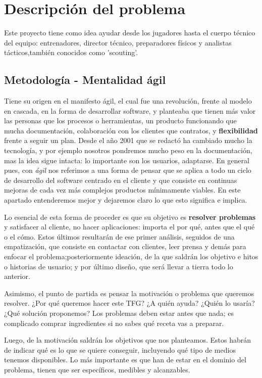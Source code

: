 \chapter{Descripción del problema}

Este proyecto tiene como idea ayudar desde los jugadores hasta 
el cuerpo técnico del equipo: entrenadores, director técnico, preparadores 
físicos y analistas tácticos,también conocidos como 'scouting'.

\section{Metodología - Mentalidad ágil}
Tiene su origen en el manifesto ágil\cite{manifesto-agil}, el cual fue una revolución, frente 
al modelo en cascada,
en la forma de desarrollar software, y planteaba que tienen más valor las personas que 
los procesos o herramientas, un producto funcionando que mucha documentación, colaboración 
con los clientes que contratos, y \textbf{flexibilidad} frente a seguir un plan. Desde el 
año 2001 que se redactó ha cambiado mucho la tecnología, y por ejemplo nosotros pondremos 
mucho peso en la documentación, mas la idea sigue intacta: lo importante son los usuarios, 
adaptarse. En general pues, con \textit{ágil} nos referimos a una forma de pensar que se aplica 
a todo un ciclo de desarrollo del software centrado en el cliente y que consiste en 
continuas mejoras de cada vez más complejos productos mínimamente viables\cite{agile-science}.
En este apartado entenderemos mejor y dejaremos claro lo que esto significa e implica.

Lo esencial de esta forma de proceder es que su objetivo es \textbf{resolver problemas} y satisfacer 
al cliente, no hacer aplicaciones: importa el por qué, antes que el qué o el cómo. Estos 
últimos resultarán de ese primer análisis, seguidos de una empatización, que consiste 
en contactar con clientes, leer prensa y demás para enfocar el problema;posteriormente 
ideación, de la que saldrán los objetivo e hitos o historias de usuario; y por último diseño, 
que será llevar a tierra todo lo anterior. 

Asimismo, el punto de partida es pensar la motivación o problema que queremos resolver. 
¿Por qué queremos hacer este TFG? ¿A quién ayuda? ¿Quién lo usaría? ¿Qué solución proponemos? 
Los problemas deben estar antes que nada; es complicado comprar ingredientes si no sabes qué 
receta vas a preparar. 

Luego, de la motivación saldrán los objetivos que nos planteamos. Estos habrán de indicar 
qué es lo que se quiere conseguir, incluyendo qué tipo de medios tenemos disponibles. Lo 
más importante es que han de estar en el dominio del problema, tienen que ser específicos, 
medibles y alcanzables\cite{objetivos}. 

